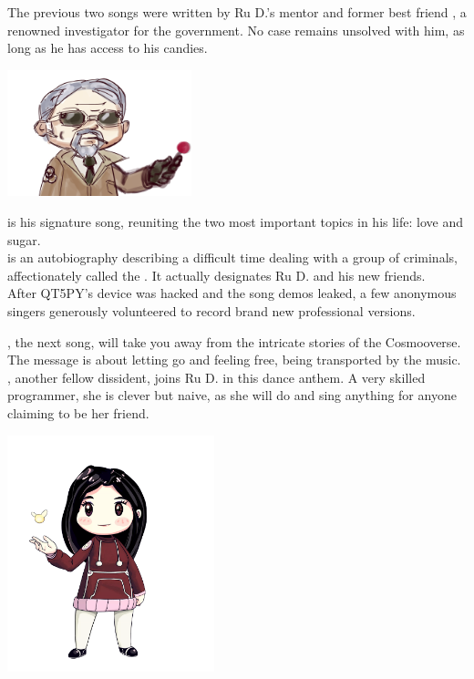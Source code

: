 
The previous two songs were written by Ru D.'s mentor and former best friend , a renowned investigator for the government. No case remains unsolved with him, as long as he has access to his candies. 

\begin{center}
\includegraphics[width=0.40\textwidth]{Assets/qt5py}
\end{center}

 is his signature song, reuniting the two most important topics in his life: love and sugar.\\

 is an autobiography describing a difficult time dealing with a group of criminals, affectionately called the . It actually designates Ru D. and his new friends. \\

After QT5PY's device was hacked and the song demos leaked, a few anonymous singers generously volunteered to record brand new professional versions.

\clearpage
{}

, the next song, will take you away from the intricate stories of the Cosmooverse. The message is about letting go and feeling free, being transported by the music.\\

, another fellow dissident, joins Ru D. in this dance anthem. A very skilled programmer, she is clever but naive, as she will do and sing anything for anyone claiming to be her friend. 

\begin{center}
\includegraphics[width=0.45\textwidth]{Assets/florrie}
\end{center}

\clearpage
